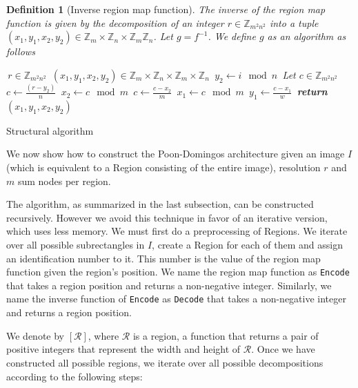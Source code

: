 \documentclass{amsart}
\makeatletter
\def\subsection{\@startsection{subsection}{3}%
  \z@{.5\linespacing\@plus.7\linespacing}{.1\linespacing}%
  {\normalfont}}
\newcommand{\region}{\mathcal}
\theoremstyle{plain}
\newcounter{dummy-def}\numberwithin{dummy-def}{section}
\newtheorem{definition}[dummy-def]{Definition}
\newcounter{dummy-thm}\numberwithin{dummy-thm}{section}
\newcounter{dummy-prop}\numberwithin{dummy-prop}{section}
\newcounter{dummy-corollary}\numberwithin{dummy-corollary}{section}
\newcounter{dummy-lemma}\numberwithin{dummy-lemma}{section}
\newcounter{dummy-ex}\numberwithin{dummy-ex}{section}
\newcounter{dummy-eg}\numberwithin{dummy-eg}{section}
\numberwithin{equation}{section}
\newcommand{\code}[1]{\lstinline[mathescape=true]{#1}}
\makeatother
\begin{document}
\begin{definition}[Inverse region map function]
  The inverse of the region map function is given by the decomposition of an integer
  $r\in\mathbb{Z}_{m^2n^2}$ into a tuple $(x_1,y_1,x_2,y_2)\in\mathbb{Z}_m\times\mathbb{Z}_n\times
  \mathbb{Z}_m\mathbb{Z}_n$. Let $g=f^{-1}$. We define $g$ as an algorithm as follows
  \begin{algorithm}[H]
    \caption{\normalfont{Function \code{Encode} $\coloneqq f^{-1} = g$}}
    \begin{algorithmic}[1]
      \normalfont%
      \Require\,$r\in\mathbb{Z}_{m^2n^2}$
      \Ensure\,$(x_1,y_1,x_2,y_2)\in\mathbb{Z}_m\times\mathbb{Z}_n\times\mathbb{Z}_m\times\mathbb{Z}_n$
      \State\,$y_2\gets i \mod n$
      \State\,Let $c\in\mathbb{Z}_{m^2n^2}$
      \State\,$c\gets\frac{(r-y_2)}{n}$
      \State\,$x_2\gets c \mod m$
      \State\,$c\gets\frac{c-x_2}{m}$
      \State\,$x_1\gets c \mod m$
      \State\,$y_1\gets\frac{c-x_1}{w}$
      \State\,\textbf{return} $(x_1,y_1,x_2,y_2)$
    \end{algorithmic}
  \end{algorithm}
\end{definition}

\subsection{Structural algorithm}

We now show how to construct the Poon-Domingos architecture given an image $I$ (which is equivalent
to a Region consisting of the entire image), resolution $r$ and $m$ sum nodes per region.

The algorithm, as summarized in the last subsection, can be constructed recursively. However we
avoid this technique in favor of an iterative version, which uses less memory. We must first do a
preprocessing of Regions. We iterate over all possible subrectangles in $I$, create a Region for
each of them and assign an identification number to it. This number is the value of the region map
function given the region's position. We name the region map function as \code{Encode} that takes a
region position and returns a non-negative integer. Similarly, we name the inverse function of
\code{Encode} as \code{Decode} that takes a non-negative integer and returns a region position.

We denote by $[\region{R}]$, where $\region{R}$ is a region, a function that returns a pair of
positive integers that represent the width and height of $\region{R}$. Once we have constructed all
possible regions, we iterate over all possible decompositions according to the following steps:
\end{document}

